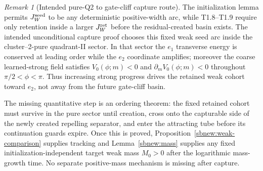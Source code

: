 \documentclass{article} %
\theoremstyle{plain}
\theoremstyle{definition}
\theoremstyle{remark}
\newtheorem{remark}[theorem]{Remark}
\begin{document}
\begin{remark}[Intended pure-Q2 to gate-cliff capture route]
\label{rem:weak-capture-route}
The initialization lemma permits $J_W^{\rm seed}$ to be any deterministic
positive-width arc, while T1.8--T1.9 require only retention inside a larger
$J_W^{\rm ret}$ before the residual-created basin exists.  The intended
unconditional capture proof chooses this fixed weak seed arc inside the
cluster--2-pure quadrant-II sector.  In that sector the $e_1$ transverse
energy is conserved at leading order while the $e_2$ coordinate amplifies;
moreover the coarse learned-strong field satisfies
$V_0(\phi;m)<0$ and $\partial_mV_0(\phi;m)<0$ throughout
$\pi/2<\phi<\pi$.  Thus increasing strong progress drives the retained weak
cohort toward $e_2$, not away from the future gate-cliff basin.

The missing quantitative step is an ordering theorem: the fixed retained
cohort must survive in the pure sector until creation, cross onto the
capturable side of the newly created repelling separator, and enter the
attracting tube before its continuation guards expire.  Once this is proved,
Proposition~\ref{sbnew:weak-comparison} supplies tracking and
Lemma~\ref{sbnew:mass} supplies any fixed initialization-independent target
weak mass $M_0>0$ after the logarithmic mass-growth time.  No separate
positive-mass mechanism is missing after capture.
\end{remark}
\end{document}
